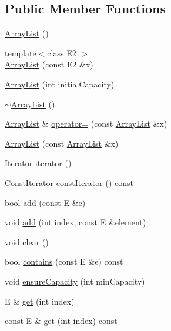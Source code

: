 \subsection*{Public Member Functions}
\begin{DoxyCompactItemize}
\item 
\hyperlink{class_array_list_a371a715481ccce9bbdbb86044eefaebb}{ArrayList} ()
\item 
{\footnotesize template$<$class E2 $>$ }\\\hyperlink{class_array_list_a23baf9480f2353c2ce1906a2f6dd9cd2}{ArrayList} (const E2 \&x)
\item 
\hyperlink{class_array_list_a5ae5b9508b562aa091759cb5768aeea8}{ArrayList} (int initialCapacity)
\item 
\hyperlink{class_array_list_aa318c2d3c6f2ee14ed3a27792efd3a32}{$\sim$ArrayList} ()
\item 
\hyperlink{class_array_list}{ArrayList} \& \hyperlink{class_array_list_a0c52a33afef5e5b24cb88456a3cde90d}{operator=} (const \hyperlink{class_array_list}{ArrayList} \&x)
\item 
\hyperlink{class_array_list_a4c8b10361aa8b19dbd12e3b41a79630a}{ArrayList} (const \hyperlink{class_array_list}{ArrayList} \&x)
\item 
\hyperlink{class_array_list_1_1_iterator}{Iterator} \hyperlink{class_array_list_a44df53a15dbd4851a1bb0473ed290958}{iterator} ()
\item 
\hyperlink{class_array_list_1_1_const_iterator}{ConstIterator} \hyperlink{class_array_list_a786a7383044b94691f12ab53a680dafb}{constIterator} () const 
\item 
bool \hyperlink{class_array_list_a07811697c3e5c53665d06855258eefa4}{add} (const E \&e)
\item 
void \hyperlink{class_array_list_a15eaaa22218a4b9eff398ab18a392cbf}{add} (int index, const E \&element)
\item 
void \hyperlink{class_array_list_ae48149564e6372f130a27b26bf5371f9}{clear} ()
\item 
bool \hyperlink{class_array_list_ae43ac84e5f0c976bac66a4f93fc7029c}{contains} (const E \&e) const 
\item 
void \hyperlink{class_array_list_afb9135e6c2ec8c65f823a5cb74b728f5}{ensureCapacity} (int minCapacity)
\item 
E \& \hyperlink{class_array_list_a4356ce8e7e3928d22b0349528d0d1726}{get} (int index)
\item 
const E \& \hyperlink{class_array_list_a2727014b60c125348d9fac3c0f9ce32b}{get} (int index) const 

\end{DoxyCompactItemize}
